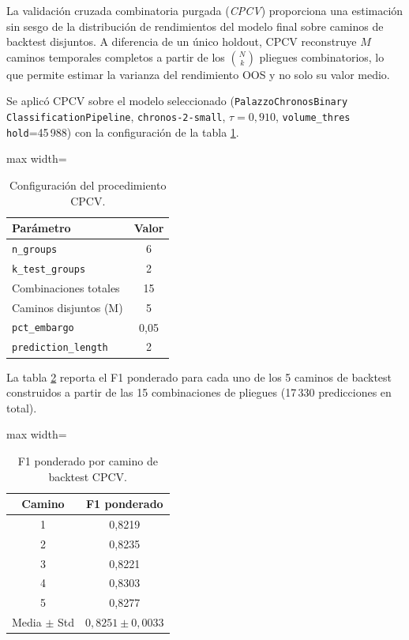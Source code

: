 La validación cruzada combinatoria purgada (\textit{CPCV}) proporciona una estimación sin sesgo de la distribución de rendimientos del modelo final sobre caminos de backtest disjuntos. A diferencia de un único holdout, CPCV reconstruye $M$ caminos temporales completos a partir de los $\binom{N}{k}$ pliegues combinatorios, lo que permite estimar la varianza del rendimiento OOS y no solo su valor medio.

Se aplicó CPCV sobre el modelo seleccionado (\texttt{PalazzoChronosBinary}\\\texttt{ClassificationPipeline}, \texttt{chronos-2-small}, $\tau=0,910$, \texttt{volume\_thres}\\\texttt{hold}=45\,988) con la configuración de la tabla \ref{tab:cpcv_config}.

\begin{table}[H]
    \centering
    \caption[Configuración CPCV]{Configuración del procedimiento CPCV.}
    \small
    \begin{adjustbox}{max width=\textwidth}
    \begin{tabular}{l c}
        \toprule
        \textbf{Parámetro} & \textbf{Valor} \\
        \midrule
        \texttt{n\_groups}            & 6    \\
        \texttt{k\_test\_groups}      & 2    \\
        Combinaciones totales         & 15   \\
        Caminos disjuntos (M) & 5    \\
        \texttt{pct\_embargo}         & 0,05 \\
        \texttt{prediction\_length}   & 2    \\
        \bottomrule
    \end{tabular}
    \end{adjustbox}
    \label{tab:cpcv_config}
\end{table}

La tabla \ref{tab:cpcv_paths} reporta el F1 ponderado para cada uno de los 5 caminos de backtest construidos a partir de las 15 combinaciones de pliegues (17\,330 predicciones en total).

\begin{table}[H]
    \centering
    \caption[F1 por camino CPCV]{F1 ponderado por camino de backtest CPCV.}
    \small
    \begin{adjustbox}{max width=\textwidth}
    \begin{tabular}{c c}
        \toprule
        \textbf{Camino} & \textbf{F1 ponderado} \\
        \midrule
        1 & 0,8219 \\
        2 & 0,8235 \\
        3 & 0,8221 \\
        4 & 0,8303 \\
        5 & 0,8277 \\
        \midrule
        Media $\pm$ Std & $0,8251 \pm 0,0033$ \\
        \bottomrule
    \end{tabular}
    \end{adjustbox}
    \label{tab:cpcv_paths}
\end{table}

